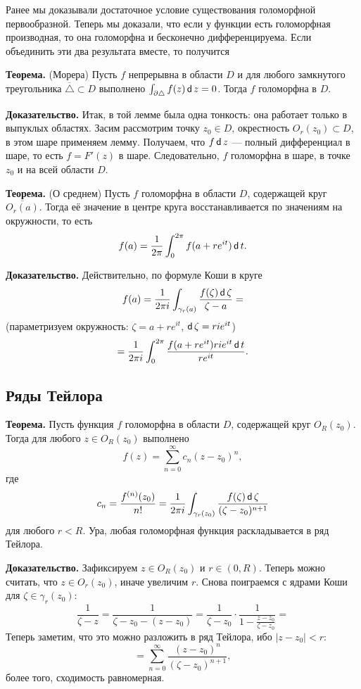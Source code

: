 Ранее мы доказывали достаточное условие существования голоморфной первообразной.
Теперь мы доказали, что если у функции есть голоморфная производная, то она голоморфна и бесконечно дифференцируема.
Если объединить эти два результата вместе, то получится

\textbf{Теорема.} (Морера) Пусть $f$ непрерывна в области $D$ и для любого замкнутого треугольника $\overline \triangle \subset D$ выполнено $\int_{\partial \triangle} f(z) \operatorname{\mathsf d} z = 0$.
Тогда $f$ голоморфна в $D$.

\textbf{Доказательство.} Итак, в той лемме была одна тонкость: она работает только в выпуклых областях.
Засим рассмотрим точку $z_0 \in D$, окрестность $O_r(z_0) \subset D$, в этом шаре применяем лемму.
Получаем, что $f \operatorname{\mathsf d} z$ --- полный дифференциал в шаре, то есть $f = F'(z)$ в шаре.
Следовательно, $f$ голоморфна в шаре, в точке $z_0$ и на всей области $D$.

\QED

\textbf{Теорема.} (О среднем) Пусть $f$ голоморфна в области $D$, содержащей круг $\overline{O_r(a)}$.
Тогда её значение в центре круга восстанавливается по значениям на окружности, то есть
\[
    f(a) = \frac{1}{2\pi} \int_0^{2\pi} f(a + re^{it}) \operatorname{\mathsf d} t.
\]

\textbf{Доказательство.} Действительно, по формуле Коши в круге
\[
    f(a) = \frac{1}{2\pi i} \int_{\gamma_r(a)} \frac{f(\zeta) \operatorname{\mathsf d} \zeta}{\zeta - a} =
\]
(параметризуем окружность: $\zeta = a + re^{it}$, $\operatorname{\mathsf d} \zeta = ri e^{it}$)
\[
    = \frac{1}{2\pi i} \int_0^{2 \pi} \frac{f(a + re^{it}) ri e^{it} \operatorname{\mathsf d} t}{re^{it}}.
\]

\QED

\subsection{Ряды Тейлора}
\textbf{Теорема.} Пусть функция $f$ голоморфна в области $D$, содержащей круг $O_R(z_0)$.
Тогда для любого $z \in O_R(z_0)$ выполнено
\[
    f(z) = \sum_{n=0}^{\infty} c_n(z - z_0)^n,
\]
где
\[
    c_n = \frac{f^{(n)}(z_0)}{n!} = \frac{1}{2\pi i} \int_{\gamma_r(z_0)} \frac{f(\zeta) \operatorname{\mathsf d} \zeta}{(\zeta - z_0)^{n+1}}
\]
для любого $r < R$.
Ура, любая голоморфная функция раскладывается в ряд Тейлора.

\textbf{Доказательство.} Зафиксируем $z \in O_R(z_0)$ и $r \in (0, R)$.
Теперь можно считать, что $z \in O_r(z_0)$, иначе увеличим $r$.
Снова поиграемся с ядрами Коши для $\zeta \in \gamma_r(z_0)$:
\[
    \frac{1}{\zeta - z} = \frac{1}{\zeta - z_0 - (z - z_0)} = \frac{1}{\zeta - z_0} \cdot \frac{1}{1 - \frac{z - z_0}{\zeta - z_0}} =
\]
Теперь заметим, что это можно разложить в ряд Тейлора, ибо $|z - z_0| < r$:
\[
    = \sum_{n=0}^{\infty} \frac{(z - z_0)^n}{(\zeta - z_0)^{n+1}},
\]
более того, сходимость равномерная.

